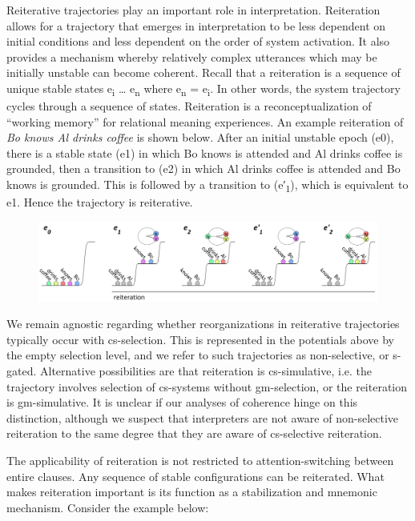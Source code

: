   Reiterative trajectories play an important role in interpretation. Reiteration allows for a trajectory that emerges in interpretation to be less dependent on initial conditions and less dependent on the order of system activation. It also provides a mechanism whereby relatively complex utterances which may be initially unstable can become coherent. Recall that a reiteration is a sequence of unique stable states e\textsubscript{i} … e\textsubscript{n} where e\textsubscript{n} = e\textsubscript{i}. In other words, the system trajectory cycles through a sequence of states. Reiteration is a reconceptualization of “working memory” for relational meaning experiences. An example reiteration of \textit{Bo knows Al drinks coffee} is shown below. After an initial unstable epoch (e0), there is a stable state (e1) in which {\textbar}Bo knows{\textbar} is attended and {\textbar}Al drinks coffee{\textbar} is grounded, then a transition to (e2) in which {\textbar}Al drinks coffee{\textbar} is attended and {\textbar}Bo knows{\textbar} is grounded. This is followed by a transition to (e′\textsubscript{1}), which is equivalent to e1. Hence the trajectory is reiterative.

  
\begin{figure}
\includegraphics[width=\textwidth]{figures/Tilsen-img122.png}
\caption{\missingcaption}
\label{fig:6:3}
\end{figure}
 

  We remain agnostic regarding whether reorganizations in reiterative trajectories typically occur with cs-selection. This is represented in the potentials above by the empty selection level, and we refer to such trajectories as non-selective, or s-gated. Alternative possibilities are that reiteration is cs-simulative, i.e. the trajectory involves selection of cs-systems without gm-selection, or the reiteration is gm-simulative. It is unclear if our analyses of coherence hinge on this distinction, although we suspect that interpreters are not aware of non-selective reiteration to the same degree that they are aware of cs-selective reiteration.  

  The applicability of reiteration is not restricted to attention-switching between entire clauses. Any sequence of stable configurations can be reiterated. What makes reiteration important is its function as a stabilization and mnemonic mechanism. Consider the example below:  


